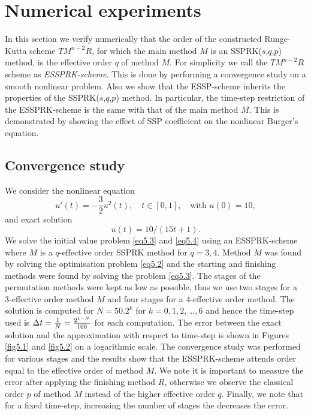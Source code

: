 \section{Numerical experiments}\label{sec:numerics}

In this section we verify numerically that the order of the constructed Runge-Kutta scheme $TM^{n-2}R$, for which the main method $M$ is an SSPRK($s$,$q$,$p$) method, is the effective order $q$ of method $M$. For simplicity we call the $TM^{n-2}R$ scheme as \emph{ESSPRK-scheme}. This is done by performing a convergence study on a smooth nonlinear problem. Also we show that the ESSP-scheme inherits the properties of the SSPRK($s$,$q$,$p$) method. In particular, the time-step restriction of the ESSPRK-scheme is the same with that of the main method $M$. This is demonstrated by showing the effect of SSP coefficient on the nonlinear Burger's equation.

\subsection{Convergence study}\label{subsec:convergence}

We consider the nonlinear equation
\begin{equation}\label{eq5.3}
    u'(t) = -\frac{3}{2}u^{2}(t), \quad t \in [0,1], \quad \text{with } u(0) = 10,
\end{equation}
and exact solution
\begin{equation}\label{eq5.4}
    u(t) = 10/(15t + 1).
\end{equation}
We solve the initial value problem \eqref{eq5.3} and \eqref{eq5.4} using an ESSPRK-scheme where $M$ is a $q$-effective order SSPRK method for $q = 3, 4$. 
Method $M$ was found by solving the optimisation problem \eqref{eq5.2} and the starting and finishing methods were found by solving the problem \eqref{eq5.3}. 
The stages of the permutation methods were kept as low as possible, thus we use two stages for a 3-effective order method $M$ and four stages for a 4-effective order method. 
The solution is computed for $N = 50.2^{k}$ for $k = 0, 1, 2, \dots, 6$ and hence the time-step used is $\Delta t = \frac{1}{N} = \frac{2^{1-N}}{100}$ for each computation. 
The error between the exact solution and the approximation with respect to time-step is shown in Figures \ref{fig5.1} and \ref{fig5.2} on a logarithmic scale. 
The convergence study was performed for various stages and the results show that the ESSPRK-scheme attends order equal to the effective order of method $M$. 
We note it is important to measure the error after applying the finishing method $R$, otherwise we observe the
classical order $p$ of method $M$ instead of the higher effective order $q$. 
Finally, we note that for a fixed time-step, increasing the number of stages the decreases the error.

